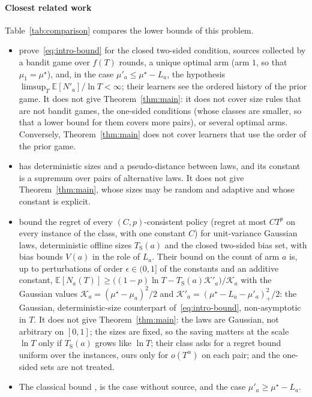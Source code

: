 \documentclass[11pt]{article}
\newcommand{\E}{\mathbb{E}}
\begin{document}
\paragraph{Closest related work} Table~\ref{tab:comparison} compares the lower bounds of this
problem.
\begin{itemize}
\item \citet[Theorem~2]{PMRM26} prove~\eqref{eq:intro-bound} for the closed two-sided condition,
  sources collected by a bandit game over $f(T)$ rounds, a unique optimal arm (arm $1$, so that
  $\mu_1=\mu^\star$), and, in the case $\mu'_a\le\mu^\star-L_a$, the hypothesis $\limsup_T\E[N'_a]/\ln T<\infty$; their learners see the
  ordered history of the prior game. It does not give Theorem~\ref{thm:main}: it does not cover size
  rules that are not bandit games, the one-sided conditions (whose classes are smaller, so that a
  lower bound for them covers more pairs), or several optimal arms. Conversely,
  Theorem~\ref{thm:main} does not cover learners that use the order of the prior game.
\item \citet[Theorem~3]{PMM25} has deterministic sizes and a pseudo-distance between laws, and its
  constant is a supremum over pairs of alternative laws. It does not give Theorem~\ref{thm:main},
  whose sizes may be random and adaptive and whose constant is explicit.
\item \citet[Theorem~3]{CL24} bound the regret of every $(C,p)$-consistent policy (regret at most
  $CT^p$ on every instance of the class, with one constant $C$) for unit-variance Gaussian laws,
  deterministic offline sizes $T_{\mathrm S}(a)$ and the closed two-sided bias set, with bias bounds
  $V(a)$ in the role of $L_a$. Their bound on the count of arm $a$ \citep[Appendix~D.2]{CL24} is,
  up to perturbations of order $\epsilon\in(0,1]$ of the constants and an additive constant,
  $\E[N_a(T)]\ge\big((1-p)\ln T-T_{\mathrm S}(a)\mathcal K'_a\big)/\mathcal K_a$ with the Gaussian
  values $\mathcal K_a=(\mu^\star-\mu_a)^2/2$ and $\mathcal K'_a=(\mu^\star-L_a-\mu'_a)_+^2/2$: the
  Gaussian, deterministic-size counterpart of~\eqref{eq:intro-bound}, non-asymptotic in $T$. It
  does not give Theorem~\ref{thm:main}: the laws are Gaussian, not arbitrary on $[0,1]$;
  the sizes are fixed, so the saving matters at the scale $\ln T$ only if $T_{\mathrm S}(a)$ grows like
  $\ln T$; their class asks for a regret bound uniform over the instances, ours only for
  $o(T^\alpha)$ on each pair; and the one-sided sets are not treated.
\item The classical bound \citep{LR85,BK96}, \citep[Theorem~1]{GMS19} is the case without source,
  and the case $\mu'_a\ge\mu^\star-L_a$.
\end{itemize}
\end{document}
